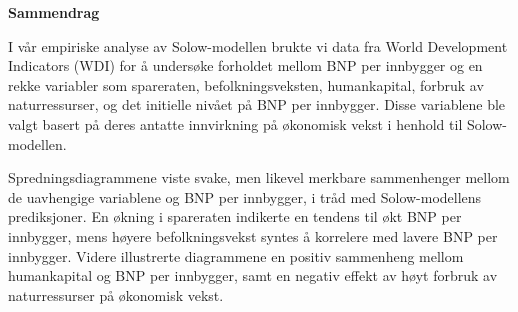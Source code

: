 \documentclass[
  12pt,
  a4paper,
  DIV=11,
  numbers=noendperiod]{scrartcl}
\begin{document}






\thispagestyle{plain}
\begin{center}
    \Large
    \textbf{Sammendrag}
\end{center}

I vår empiriske analyse av Solow-modellen brukte vi data fra World Development Indicators (WDI) for å undersøke forholdet mellom BNP per innbygger og en rekke variabler som spareraten, befolkningsveksten, humankapital, forbruk av naturressurser, og det initielle nivået på BNP per innbygger. Disse variablene ble valgt basert på deres antatte innvirkning på økonomisk vekst i henhold til Solow-modellen.

Spredningsdiagrammene viste svake, men likevel merkbare sammenhenger mellom de uavhengige variablene og BNP per innbygger, i tråd med Solow-modellens prediksjoner. En økning i spareraten indikerte en tendens til økt BNP per innbygger, mens høyere befolkningsvekst syntes å korrelere med lavere BNP per innbygger. Videre illustrerte diagrammene en positiv sammenheng mellom humankapital og BNP per innbygger, samt en negativ effekt av høyt forbruk av naturressurser på økonomisk vekst.
\end{document}
